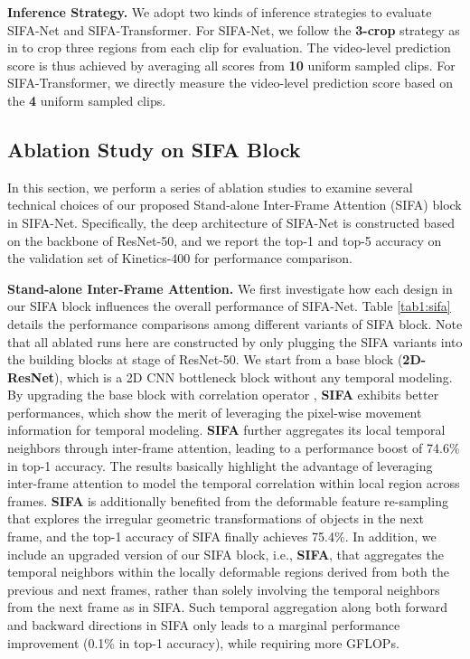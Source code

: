 \documentclass[10pt,twocolumn,letterpaper]{article}
\begin{document}
\textbf{Inference Strategy.} We adopt two kinds of inference strategies to evaluate SIFA-Net and SIFA-Transformer. For SIFA-Net, we follow the \textbf{3-crop} strategy as in \cite{Christoph:ICCV19} to crop three  regions from each clip for evaluation. The video-level prediction score is thus achieved by averaging all scores from \textbf{10} uniform sampled clips. For SIFA-Transformer, we directly measure the video-level prediction score based on the \textbf{4} uniform sampled clips.



\subsection{Ablation Study on SIFA Block}
In this section, we perform a series of ablation studies to examine several technical choices of our proposed Stand-alone Inter-Frame Attention (SIFA) block in SIFA-Net.
Specifically, the deep architecture of SIFA-Net is constructed based on the backbone of ResNet-50, and we report the top-1 and top-5 accuracy on the validation set of Kinetics-400 for performance comparison.

\textbf{Stand-alone Inter-Frame Attention.}
We first investigate how each design in our SIFA block influences the overall performance of SIFA-Net. Table \ref{tab1:sifa} details the performance comparisons among different variants of SIFA block. Note that all ablated runs here are constructed by only plugging the SIFA variants into the building blocks at  stage of ResNet-50. We start from a base block (\textbf{2D-ResNet}), which is a 2D CNN bottleneck block without any temporal modeling. By upgrading the base block with correlation operator \cite{Wang:CVPR20}, \textbf{SIFA} exhibits better performances, which show the merit of leveraging the pixel-wise movement information for temporal modeling. \textbf{SIFA} further aggregates its local temporal neighbors through inter-frame attention, leading to a performance boost of 74.6\% in top-1 accuracy. The results basically highlight the advantage of leveraging inter-frame attention to model the temporal correlation within local region across frames. \textbf{SIFA} is additionally benefited from the deformable feature re-sampling that explores the irregular geometric transformations of objects in the next frame, and the top-1 accuracy of SIFA finally achieves 75.4\%. In addition, we include an upgraded version of our SIFA block, i.e., \textbf{SIFA}, that aggregates the temporal neighbors within the locally deformable regions derived from both the previous and next frames, rather than solely involving the temporal neighbors from the next frame as in SIFA. Such temporal aggregation along both forward and backward directions in SIFA only leads to a marginal performance improvement (0.1\% in top-1 accuracy), while requiring more GFLOPs.
\end{document}
